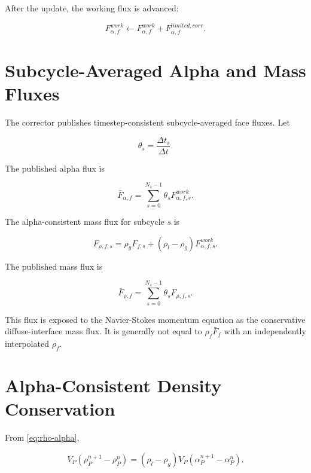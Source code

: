 \documentclass[11pt]{article}
\begin{document}
After the update, the working flux is advanced:

\begin{equation}
  F_{\alpha,f}^{work}
  \leftarrow
  F_{\alpha,f}^{work}
  +
  F_{\alpha,f}^{limited,corr}.
\end{equation}

\section{Subcycle-Averaged Alpha and Mass Fluxes}

The corrector publishes timestep-consistent subcycle-averaged face fluxes.  Let

\begin{equation}
  \theta_s=\frac{\Delta t_s}{\Delta t}.
\end{equation}

The published alpha flux is

\begin{equation}
  \bar{F}_{\alpha,f}
  =
  \sum_{s=0}^{N_s-1}
  \theta_s F_{\alpha,f,s}^{work}.
  \label{eq:published-alpha-flux}
\end{equation}

The alpha-consistent mass flux for subcycle \(s\) is

\begin{equation}
  F_{\rho,f,s}
  =
  \rho_g F_{f,s}
  +
  (\rho_l-\rho_g)
  F_{\alpha,f,s}^{work}.
  \label{eq:rho-flux-subcycle}
\end{equation}

The published mass flux is

\begin{equation}
  \bar{F}_{\rho,f}
  =
  \sum_{s=0}^{N_s-1}
  \theta_s F_{\rho,f,s}.
  \label{eq:published-rho-flux}
\end{equation}

This flux is exposed to the Navier-Stokes momentum equation as the conservative
diffuse-interface mass flux.  It is generally not equal to
\(\rho_f\bar{F}_f\) with an independently interpolated \(\rho_f\).

\section{Alpha-Consistent Density Conservation}

From \eqref{eq:rho-alpha},

\begin{equation}
  V_P(\rho_P^{n+1}-\rho_P^n)
  =
  (\rho_l-\rho_g)
  V_P(\alpha_P^{n+1}-\alpha_P^n).
\end{equation}
\end{document}
